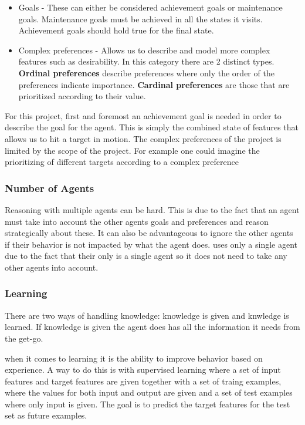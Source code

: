 \begin{itemize}
  \item Goals - These can either be considered achievement goals or
  maintenance goals. Maintenance goals must be achieved in all the states
  it visits. Achievement goals should hold true for the final state.
  \item Complex preferences - Allows us to describe and model more complex
  features such as desirability. In this category there are 2 distinct types.
  \textbf{Ordinal preferences} describe preferences where only the order of the
  preferences indicate importance. \textbf{Cardinal preferences} are those that
  are prioritized according to their value.
\end{itemize}

For this project, first and foremost an achievement goal is needed in order to
describe the goal for the agent. This is simply the combined state of features
that allows us to hit a target in motion. The complex preferences of the
project is limited by the scope of the project. For example one could imagine
the prioritizing of different targets according to a complex preference

\subsubsection{Number of Agents}
Reasoning with multiple agents can be hard. This is due to the fact that an
agent must take into account the other agents goals and preferences and reason
strategically about these. It can also be advantageous to ignore the other
agents if their behavior is not impacted by what the agent does.
\namep uses only a single agent due to the fact that their only is a single
agent so it does not need to take any other agents into account.




\subsubsection{Learning}
There are two ways of handling knowledge: knowledge is given and knwledge is
learned. If knowledge is given the agent does has all the information it needs
from the get-go.\nl 

when it comes to learning it is the ability to improve
behavior based on experience. A way to do this is with supervised learning where
a set of input features and target features are given together with a set of
traing examples, where the values for both input and output are given and a set
of test examples where only input is given. The goal is to predict the target
features for the test set as future examples.


